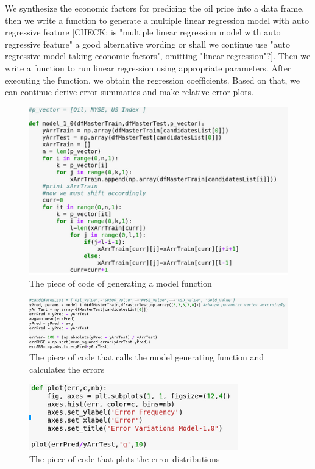 \documentclass[runningheads]{llncs}
\begin{document}
\noindent We synthesize the economic factors for predicing the oil price into a data frame, then we write a function to generate a multiple linear regression model with auto regressive feature [CHECK: is "multiple linear regression model with auto regressive feature" a good alternative wording or shall we continue use "auto regressive model taking economic factors", omitting "linear regression"?]. Then we write a function to run linear regression using appropriate parameters. After executing the function, we obtain the regression coefficients. Based on that, we can continue derive error summaries and make relative error plots. \\

\begin{figure}
\centering
\includegraphics[width=\textwidth]{ModelFunction.png}
\caption{The piece of code of generating a model function}
\label{fig:ModelFunction.png}
\end{figure}

\begin{figure}
\centering
\includegraphics[width=\textwidth]{ErrorCalculation.png}
\caption{The piece of code that calls the model generating function and calculates the errors}
\label{fig:ErrorCalculation.png}
\end{figure}

\begin{figure}
\centering
\includegraphics[width=\textwidth]{ErrorPlot.png}
\caption{The piece of code that plots the error distributions}
\label{fig:ErrorPlot.png}
\end{figure}
\end{document}
